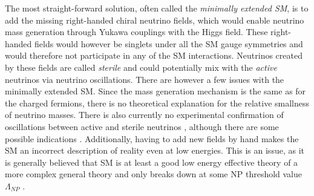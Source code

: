 The most straight-forward solution, often called the \textit{minimally extended \gls{SM}}, is to add the missing right-handed chiral neutrino fields, which would enable neutrino mass generation through Yukawa couplings with the Higgs field. These right-handed fields would however be singlets under all the \gls{SM} gauge symmetries and would therefore not participate in any of the \gls{SM} interactions. Neutrinos created by these fields are called \textit{sterile} and could potentially mix with the \textit{active} neutrinos via neutrino oscillations. There are however a few issues with the minimally extended \gls{SM}. Since the mass generation mechanism is the same as for the charged fermions, there is no theoretical explanation for the relative smallness of neutrino masses. There is also currently no experimental confirmation of oscillations between active and sterile neutrinos \cite{PDG.pdf}, although there are some possible indications \cite{LSND2001.pdf, MiniBooNE2018.pdf}. Additionally, having to add new fields by hand makes the \gls{SM} an incorrect description of reality even at low energies. This is an issue, as it is generally believed that \gls{SM} is at least a good low energy  effective theory of a more complex general theory and only breaks down at some \gls{NP} threshold value $\Lambda_{NP}$ \cite{Gonzalez-GarciaPhenomenologyMassiveNu.pdf}.



